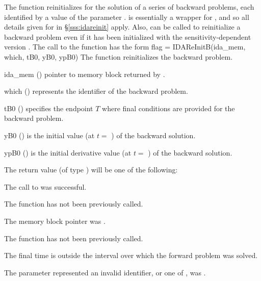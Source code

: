The function  reinitializes {\idas} for the solution of a series
of backward problems, each identified by a value of the parameter .
 is essentially a wrapper for , and so all details
given for  in \S\ref{sss:idareinit} apply.
Also,  can be called to reinitialize a backward problem even if it
has been initialized with the sensitivity-dependent version .
The call to the  function has the form
{
  flag = IDAReInitB(ida\_mem, which, tB0, yB0, ypB0)
}
{
  The function  reinitializes {\idas} the backward problem.
}
{
  \begin{args}
  \item[ida\_mem] ()
    pointer to {\idas} memory block returned by .
  \item[which] ()
    represents the identifier of the backward problem.
  \item[tB0] ()
    specifies the endpoint $T$ where final conditions are provided for the 
    backward problem.
  \item[yB0] ()
    is the initial value (at $t =$ ) of the backward solution. 
  \item[ypB0] ()
    is the initial derivative value (at $t =$ ) of the backward solution. 
  \end{args}
}
{
  The return value  (of type ) will be one of the following:
  \begin{args}
  \item[\Id{IDA\_SUCCESS}]
    The call to  was successful.
  \item[\Id{IDA\_NO\_MALLOC}]
    The function  has not been previously called.
  \item[\Id{IDA\_MEM\_NULL}] 
    The  memory block pointer was .
  \item[\Id{IDA\_NO\_ADJ}]
    The function  has not been previously called.
  \item[\Id{IDA\_BAD\_TB0}]
    The final time  is outside the interval over which the forward problem
    was solved.
  \item[\Id{IDA\_ILL\_INPUT}]
    The parameter  represented an invalid identifier, or one
    of ,  was .
  \end{args}
}
{}

